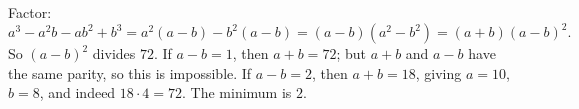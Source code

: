 Factor:
\[
a^3-a^2b-ab^2+b^3=a^2(a-b)-b^2(a-b)=(a-b)(a^2-b^2)=(a+b)(a-b)^2 .
\]
So $(a-b)^2$ divides $72$. If $a-b=1$, then $a+b=72$; but $a+b$ and $a-b$ have the same parity, so this is impossible. If $a-b=2$, then $a+b=18$, giving $a=10$, $b=8$, and indeed $18\cdot4=72$. The minimum is $\boxed{2}$.
